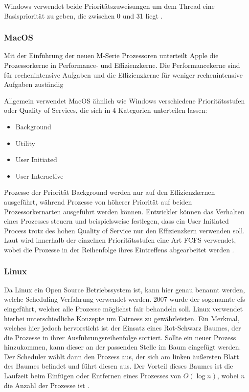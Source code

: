 Windows verwendet beide Prioritätszuweisungen um dem Thread eine Basispriorität zu geben, die zwischen 0 und 31 liegt \autocite{KarlBridgeMicrosoft.2023}.

\subsubsection{MacOS}
Mit der Einführung der neuen M-Serie Prozessoren unterteilt Apple die Prozessorkerne in Performance- und Effizienzkerne. Die Performancekerne sind für rechenintensive Aufgaben und die Effizienzkerne für weniger rechenintensive Aufgaben zuständig \autocite{hoakley.2022}

Allgemein verwendet MacOS ähnlich wie Windows verschiedene Prioritätsstufen oder Quality of Services, die sich in 4 Kategorien unterteilen lassen:
\begin{multicols}{2}
    \begin{itemize}[noitemsep]
        \item Background
        \item Utility
        \item User Initiated
        \item User Interactive
    \end{itemize}
\end{multicols}
Prozesse der Priorität Background werden nur auf den Effizienzkernen ausgeführt, während Prozesse von höherer Priorität auf beiden Prozessorkernarten ausgeführt werden können.
Entwickler können das Verhalten eines Prozesses steuern und beispielsweise festlegen, dass ein User Initiated Process trotz des hohen Quality of Service nur den Effizienzkern verwenden soll.
Laut  wird innerhalb der einzelnen Prioritätsstufen eine Art \ac{FCFS} verwendet, wobei die Prozesse in der Reihenfolge ihres Eintreffens abgearbeitet werden \autocite{hoakley.2022b}.

\subsubsection{Linux}
Da Linux ein Open Source Betriebssystem ist, kann hier genau benannt werden, welche Scheduling Verfahrung verwendet werden. 2007 wurde der sogenannte \ac{cfs} eingeführt, welcher alle Prozesse möglichst fair behandeln soll.
Linux verwendet hierbei unterschiedliche Konzepte um Fairness zu gewährleisten.
Ein Merkmal, welches hier jedoch hervorsticht ist der Einsatz eines Rot-Schwarz Baumes, der die Prozesse in ihrer Ausführungsreihenfolge sortiert.
Sollte ein neuer Prozess hinzukommen, kann dieser an der passenden Stelle im Baum eingefügt werden.
Der Scheduler wählt dann den Prozess aus, der sich am linken äußersten Blatt des Baumes befindet und führt diesen aus.
Der Vorteil dieses Baumes ist die Laufzeit beim Einfügen oder Entfernen eines Prozesses von $O(\log n)$, wobei $n$ die Anzahl der Prozesse ist \autocite{Jones.2009}.

